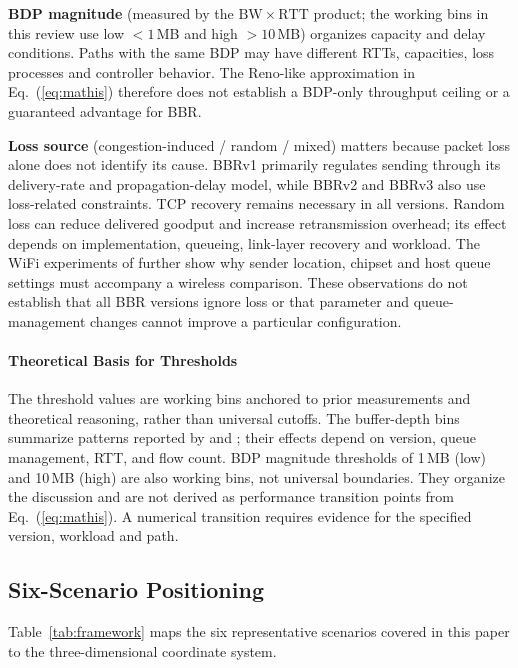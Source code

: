 \documentclass[a4paper,fleqn]{cas-sc}
\begin{document}
\textbf{BDP magnitude} (measured by the $\mathrm{BW}\times\mathrm{RTT}$ product;
the working bins in this review use low $<1$\,MB and high $>10$\,MB) organizes
capacity and delay conditions. Paths with the same BDP may have different
RTTs, capacities, loss processes and controller behavior. The Reno-like
approximation in Eq.~(\ref{eq:mathis}) therefore does not establish a BDP-only
throughput ceiling or a guaranteed advantage for BBR.

\textbf{Loss source} (congestion-induced / random / mixed) matters because
packet loss alone does not identify its cause. BBRv1 primarily regulates
sending through its delivery-rate and propagation-delay model, while
BBRv2 and BBRv3 also use loss-related constraints. TCP recovery remains
necessary in all versions. Random loss can reduce delivered goodput and
increase retransmission overhead; its effect depends on implementation,
queueing, link-layer recovery and workload. The WiFi experiments of
\citet{grazia2020bbrp} further show why sender location, chipset and host
queue settings must accompany a wireless comparison. These observations
do not establish that all BBR versions ignore loss or that parameter and
queue-management changes cannot improve a particular configuration.

\paragraph{Theoretical Basis for Thresholds}
The threshold values are working bins anchored to prior measurements and
theoretical reasoning, rather than universal cutoffs. The buffer-depth bins
summarize patterns reported by \citet{cao2019bbr} and \citet{jaeger2019bbr};
their effects depend on version, queue management, RTT, and flow count. BDP
magnitude thresholds of 1\,MB (low) and 10\,MB (high) are also working bins,
not universal boundaries. They organize the discussion and are not derived
as performance transition points from Eq.~(\ref{eq:mathis}). A numerical
transition requires evidence for the specified version, workload and path.

\subsection{Six-Scenario Positioning}
\label{sec:framework_pos}

Table~\ref{tab:framework} maps the six representative scenarios covered in this
paper to the three-dimensional coordinate system.
\end{document}
